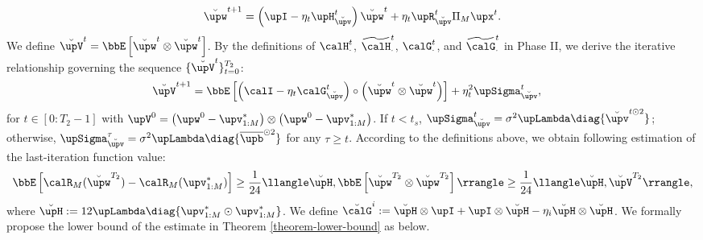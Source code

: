 \begin{align}
		\breve{\upw}^{t+1}=\left(\upI-\eta_t\upH_{\breve{\upv}}^t\right)\breve{\upw}^t+\eta_t\upR_{\breve{\upv}}^t\Pi_M\upx^t. \notag
\end{align}
We define $\breve{\upV}^t=\bbE\left[\breve{\upw}^t\otimes\breve{\upw}^t\right]$. By the definitions of $\calH_{\cdot}^t$, $\widetilde{\calH}_{\cdot}^t$, $\calG_{\cdot}^t$, and $\widetilde{\calG}_{\cdot}^t$ in Phase II, we derive the iterative relationship governing the sequence $\{\breve{\upV}^t\}_{t=0}^{T_2}$:
\begin{align}
		\breve{\upV}^{t+1}&=\bbE\left[\left(\calI-\eta_t\calG_{\breve{\upv}}^t\right)\circ\left(\breve{\upw}^t\otimes\breve{\upw}^t\right)\right]+\eta_t^2\upSigma_{\breve{\upv}}^t,
\end{align}
for $t\in[0:T_2-1]$ with $\upV^0=\left(\upw^0-\upv_{1:M}^*\right)\otimes\left(\upw^0-\upv_{1:M}^*\right)$. If $t<t_s$, $\upSigma_{\breve{\upv}}^t=\sigma^2\upLambda\diag\{\breve{\upv}^{t\odot2}\}$; otherwise, $\upSigma_{\breve{\upv}}^{\tau}=\sigma^2\upLambda\diag\{\overline{\upb}^{\odot2}\}$ for any $\tau\geq t$. According to the definitions above, we obtain following estimation of the last-iteration function value:
\begin{align}\label{lower-bound-I}
    \bbE\left[\calR_M(\breve{\upw}^{T_2})-\calR_M(\upv_{1:M}^*)\right]\geq\frac{1}{24}\llangle\breve{\upH},\bbE\left[\breve{\upw}^{T_2}\otimes\breve{\upw}^{T_2}\right]\rrangle\geq\frac{1}{24}\llangle\breve{\upH},\breve{\upV}^{T_2}\rrangle,
\end{align}
where $\breve{\upH}:=12\upLambda\diag\{\upv_{1:M}^*\odot\upv_{1:M}^*\}$. We define $\breve{\calG}^i:=\breve{\upH}\otimes\upI+\upI\otimes\breve{\upH}-\eta_i\breve{\upH}\otimes\breve{\upH}$. We formally propose the lower bound of the estimate in Theorem \ref{theorem-lower-bound} as below.

